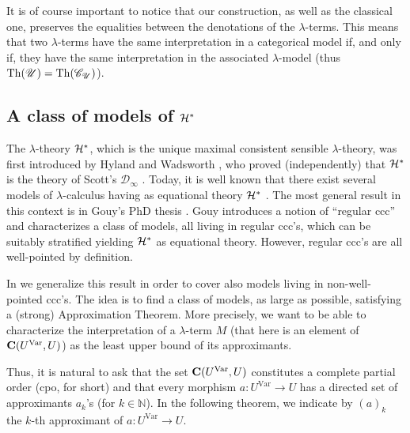 \documentclass[english]{llncs}
\renewcommand{\bold}[1]{{\bf #1}}
\newcommand{\Var}{\mathrm{Var}}
\newcommand{\cat}[1]{\bold{#1}}
\newcommand{\ro}[1]{\mathscr{#1}} \newcommand{\App}{\mathcal{A}}
\newcommand{\alg}[1]{\mathscr{#1}} \newcommand{\CE}[1]{{\mathrm{CE}(#1)}} \newcommand{\IE}[1]{{\mathrm{IE}(#1)}} \newcommand{\class}[1]{\mathbb{#1}}
\newcommand{\cH}{{\cal H}}
\newcommand{\nat}{\mathbb{N}}
\begin{document}
It is of course important to notice that our construction, as well as the classical one, preserves the equalities between the denotations of the $\lambda$-terms.
This means that two $\lambda$-terms have the same interpretation in a categorical model if, and only if, they have the same interpretation in the associated 
$\lambda$-model (thus $\Th{\ro{U}} = \Th{\alg{C}_{\ro{U}}}$).




\subsection{A class of models of $\cH^*$}

The $\lambda$-theory $\cH^*$, which is the unique maximal consistent sensible $\lambda$-theory, was first introduced by 
Hyland \cite{Hyland75} and Wadsworth \cite{Wadsworth76}, who proved (independently) that $\cH^*$ is the theory of 
Scott's $\ro{D}_\infty$ \cite[Thm.~19.2.9]{Bare}.
Today, it is well known that there exist several models of $\lambda$-calculus having as equational theory $\cH^*$
\cite{Bare,GouyTh,DiGianantonioFH91}.
The most general result in this context is in Gouy's PhD thesis \cite{GouyTh}. 
Gouy introduces a notion of ``regular ccc'' and characterizes a class of models, all living in regular ccc's, 
which can be suitably stratified yielding $\cH^*$ as equational theory. 
However, regular ccc's are all well-pointed by definition.

In \cite[Chapter~2]{ManzonettoTh} we generalize this result in order to cover also models living in non-well-pointed ccc's. 
The idea is to find a class of models, as large as possible, satisfying a (strong) Approximation Theorem.
More precisely, we want to be able to characterize the interpretation of a $\lambda$-term $M$ (that here is an element of $\cat C(U^\Var,U)$) 
as the least upper bound of its approximants.

Thus, it is natural to ask that the set $\cat C(U^\Var,U)$ constitutes a complete partial order (cpo, for short) 
and that every morphism $a:U^\Var\to U$ has a directed set of approximants $a_k$'s (for $k\in\nat$).
In the following theorem, we indicate by $(a)_k$ the $k$-th approximant of $a:U^\Var\to U$.
\end{document}
